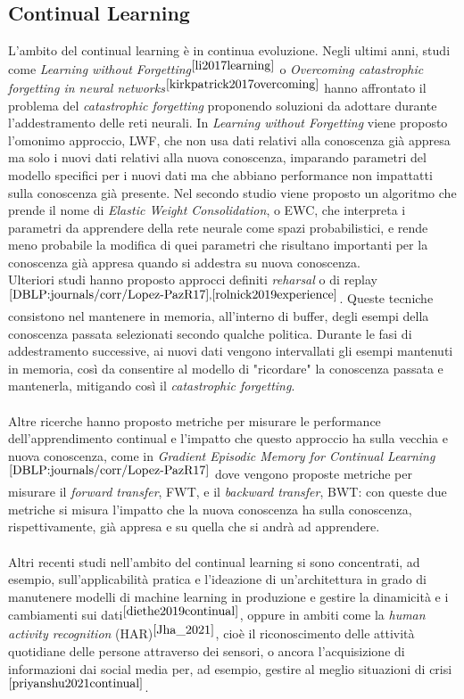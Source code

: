 \subsection{Continual Learning} L'ambito del continual learning è in continua evoluzione. Negli ultimi anni, studi come \textit{Learning without Forgetting}$^{\cite{li2017learning}}$ o \textit{Overcoming catastrophic forgetting in neural networks}$^{\cite{kirkpatrick2017overcoming}}$ hanno affrontato il problema del \textit{catastrophic forgetting} proponendo soluzioni da adottare durante l'addestramento delle reti neurali. In \textit{Learning without Forgetting} viene proposto l'omonimo approccio, LWF, che non usa dati relativi alla conoscenza già appresa ma solo i nuovi dati relativi alla nuova conoscenza, imparando parametri del modello specifici per i nuovi dati ma che abbiano performance non impattatti sulla conoscenza già presente. Nel secondo studio viene proposto un algoritmo che prende il nome di \textit{Elastic Weight Consolidation}, o EWC, che interpreta i parametri da apprendere della rete neurale come spazi probabilistici, e rende meno probabile la modifica di quei parametri che risultano importanti per la conoscenza già appresa quando si addestra su nuova conoscenza.\\
Ulteriori studi hanno proposto approcci definiti \textit{reharsal} o di replay$^{\cite{DBLP:journals/corr/Lopez-PazR17},\cite{rolnick2019experience}}$. Queste tecniche consistono nel mantenere in memoria, all'interno di buffer, degli esempi della conoscenza passata selezionati secondo qualche politica. Durante le fasi di addestramento successive, ai nuovi dati vengono intervallati gli esempi mantenuti in memoria, così da consentire al modello di "ricordare" la conoscenza passata e mantenerla, mitigando così il \textit{catastrophic forgetting}.\\\\
Altre ricerche hanno proposto metriche per misurare le performance dell'apprendimento continual e l'impatto che questo approccio ha sulla vecchia e nuova conoscenza, come in \textit{Gradient Episodic Memory for Continual Learning}$^{\cite{DBLP:journals/corr/Lopez-PazR17}}$ dove vengono proposte metriche per misurare il \textit{forward transfer}, FWT, e il \textit{backward transfer}, BWT: con queste due metriche si misura l'impatto che la nuova conoscenza ha sulla conoscenza, rispettivamente, già appresa e su quella che si andrà ad apprendere.\\\\
Altri recenti studi nell'ambito del continual learning si sono concentrati, ad esempio, sull'applicabilità pratica e l'ideazione di un'architettura in grado di manutenere modelli di machine learning in produzione e gestire la dinamicità e i cambiamenti sui dati$^{\cite{diethe2019continual}}$, oppure in ambiti come la \textit{human activity recognition} (HAR)$^{\cite{Jha_2021}}$, cioè il riconoscimento delle attività quotidiane delle persone attraverso dei sensori, o ancora l'acquisizione di informazioni dai social media per, ad esempio, gestire al meglio situazioni di crisi$^{\cite{priyanshu2021continual}}$.\\
